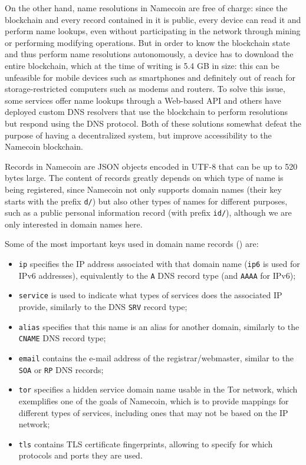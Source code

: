 \documentclass[mscthesis]{usiinfthesis}
\begin{document}
On the other hand, name resolutions in Namecoin are free of charge: since the blockchain and every record contained in it is public, every device can read it and perform name lookups, even without participating in the network through mining or performing modifying operations. But in order to know the blockchain state and thus perform name resolutions autonomously, a device has to download the entire blockchain, which at the time of writing is 5.4 GB in size: this can be unfeasible for mobile devices such as smartphones and definitely out of reach for storage-restricted computers such as modems and routers. To solve this issue, some services offer name lookups through a Web-based API and others have deployed custom DNS resolvers that use the blockchain to perform resolutions but respond using the DNS protocol. Both of these solutions somewhat defeat the purpose of having a decentralized system, but improve accessibility to the Namecoin blockchain.

Records in Namecoin are JSON objects encoded in UTF-8 that can be up to 520 bytes large. The content of records greatly depends on which type of name is being registered, since Namecoin not only supports domain names (their key starts with the prefix \texttt{d/}) but also other types of names for different purposes, such as a public personal information record (with prefix \texttt{id/}), although we are only interested in domain names here.

Some of the most important keys used in domain name records (\cite{website:namecoindomainwiki}) are:
\begin{itemize}
	\item \texttt{ip} specifies the IP address associated with that domain name (\texttt{ip6} is used for IPv6 addresses), equivalently to the \texttt{A} DNS record type (and \texttt{AAAA} for IPv6);
	\item \texttt{service} is used to indicate what types of services does the associated IP provide, similarly to the DNS \texttt{SRV} record type;
	\item \texttt{alias} specifies that this name is an alias for another domain, similarly to the \texttt{CNAME} DNS record type;
	\item \texttt{email} contains the e-mail address of the registrar/webmaster, similar to the \texttt{SOA} or \texttt{RP} DNS records;
	\item \texttt{tor} specifies a hidden service domain name usable in the Tor network, which exemplifies one of the goals of Namecoin, which is to provide mappings for different types of services, including ones that may not be based on the IP network;
	\item \texttt{tls} contains TLS certificate fingerprints, allowing to specify for which protocols and ports they are used.
\end{itemize}
\end{document}
